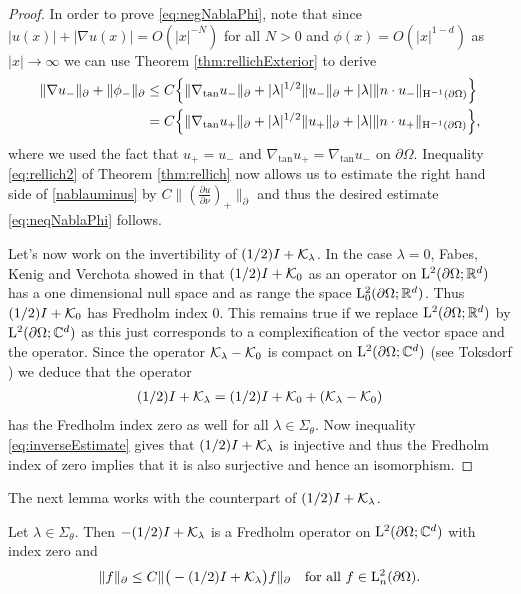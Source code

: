 \begin{proof}
  In order to prove \eqref{eq:negNablaPhi}, note that since $|u(x)| + |\nabla u(x)| = O(|x|^{-N})$ for all $N > 0$ and $\phi(x) = O(|x|^{1 - d})$ as $|x| \to \infty$ we can use Theorem \ref{thm:rellichExterior} to derive
  \begin{align}
    \|\nabla u_-\|_\partial + \|\phi_-\|_\partial
    &\leq C \Big\{ \|\nabla_{\mathrm{tan}} u_- \|_\partial + |\lambda|^{1/2} \| u_-\|_\partial + |\lambda| \| n \cdot u_-\|_{\mathrm{H}^{-1}(\partial\Omega)} \Big\} \nonumber\\
    \label{eq:nablauminus}
    &= C \Big\{ \|\nabla_{\mathrm{tan}} u_+ \|_\partial + |\lambda|^{1/2} \| u_+ \|_\partial + |\lambda| \|n \cdot u_+ \|_{\mathrm{H}^{-1}(\partial\Omega)} \Big\},
  \end{align}
  where we used the fact that $u_+ = u_-$ and $\nabla_{\mathrm{tan}} u_+ = \nabla_{\mathrm{tan}} u_-$ on $\partial\Omega$.
  Inequality \eqref{eq:rellich2} of Theorem \ref{thm:rellich} now allows us to estimate the right hand side of \eqref{nablauminus} by $C \|(\frac{\partial u}{\partial \nu} )_+ \|_\partial$ and thus the desired estimate \eqref{eq:neqNablaPhi} follows.

  Let's now work on the invertibility of $(1/2) I + \mathcal{K}_\lambda$. In the case $\lambda = 0$, Fabes, Kenig and Verchota showed in \cite{fabesKenigVerchota} that $(1/2) I + \mathcal{K}_0$ as an operator on $\mathrm{L}^2(\partial\Omega; \mathbb{R}^d)$ has a one dimensional null space and as range the space $\mathrm{L}_0^2(\partial\Omega; \mathbb{R}^d)$.
  Thus $(1/2) I + \mathcal{K}_0$ has Fredholm index $0$.
  This remains true if we replace $\mathrm{L}^2(\partial\Omega; \mathbb{R}^d)$ by $\mathrm{L}^2(\partial\Omega; \mathbb{C}^d)$ as this just corresponds to a complexification of the vector space and the operator. 
  Since the operator $\mathcal{K}_\lambda - \mathcal{K}_0$ is compact on $\mathrm{L}^2(\partial\Omega; \mathbb{C}^d)$ (see Toksdorf \cite{tolksdorfDiss}) we deduce that the operator
  \begin{align*}
    (1/2)I + \mathcal{K}_\lambda = (1/2)I + \mathcal{K}_0 + (\mathcal{K}_\lambda - \mathcal{K}_0)
  \end{align*}
  has the Fredholm index zero as well for all $\lambda \in \Sigma_\theta$.
  Now inequality \eqref{eq:inverseEstimate} gives that $(1/2)I + \mathcal{K}_\lambda$ is injective and thus the Fredholm index of zero implies that it is also surjective and hence an isomorphism.
\end{proof}

The next lemma works with the counterpart of $(1/2)I + \mathcal{K}_\lambda$.

\begin{lem}
  \label{lem:inverseEstimate}
  Let $\lambda \in \Sigma_\theta$.
  Then $-(1/2)I + \mathcal{K}_\lambda$ is a Fredholm operator on $\mathrm{L}^2(\partial\Omega; \mathbb{C}^d)$ with index zero and
  \begin{align}
    \label{eq:inverseEstimate2}
    \| f\|_\partial \leq C \| \big( - (1/2) I + \mathcal{K}_\lambda \big) f \|_\partial \quad\text{for all } f \in \mathrm{L}^2_n(\partial\Omega).
  \end{align}
\end{lem}


